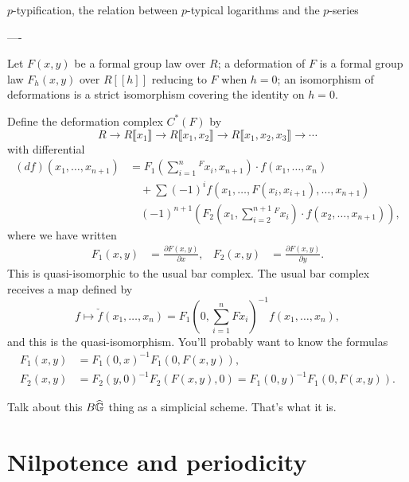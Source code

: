 $p$-typification, the relation between $p$-typical logarithms and the $p$-series

----



Let $F(x, y)$ be a formal group law over $R$; a deformation of $F$ is a formal group law $F_h(x, y)$ over $R[[h]]$ reducing to $F$ when $h = 0$; an isomorphism of deformations is a strict isomorphism covering the identity on $h = 0$.

Define the deformation complex $C^*(F)$ by \[R \to R\llbracket x_1 \rrbracket \to R\llbracket x_1, x_2 \rrbracket \to R\llbracket x_1, x_2, x_3 \rrbracket \to \cdots\] with differential
\begin{align*}
(df)(x_1, \ldots, x_{n+1}) & = F_1\left(\sum_{i=1}^n {}^F x_i, x_{n+1} \right) \cdot f(x_1, \ldots, x_n) \\
& \quad + \sum (-1)^i f(x_1, \ldots, F(x_i, x_{i+1}), \ldots, x_{n+1}) \\
& \quad (-1)^{n+1} \left( F_2\left(x_1, \sum_{i=2}^{n+1} {}^F x_i \right) \cdot f(x_2, \ldots, x_{n+1}) \right),
\end{align*}
where we have written
\begin{align*}
F_1(x, y) & = \frac{\partial F(x, y)}{\partial x}, &
F_2(x, y) & = \frac{\partial F(x, y)}{\partial y}.
\end{align*}
This is quasi-isomorphic to the usual bar complex. The usual bar complex receives a map defined by \[f \mapsto \check{f}(x_1, \ldots, x_n) = F_1\left( 0, \sum_{i=1}^n {}F x_i \right)^{-1} f(x_1, \ldots, x_n),\] and this is the quasi-isomorphism. You'll probably want to know the formulas
\begin{align*}
F_1(x, y) & = F_1(0, x)^{-1} F_1(0, F(x, y)), \\
F_2(x, y) & = F_2(y, 0)^{-1} F_2(F(x, y), 0) = F_1(0, y)^{-1} F_1(0, F(x, y)).
\end{align*}


Talk about this $B\widehat{\mathbb G}$ thing as a simplicial scheme. That's what it is.








\section{Nilpotence and periodicity}

